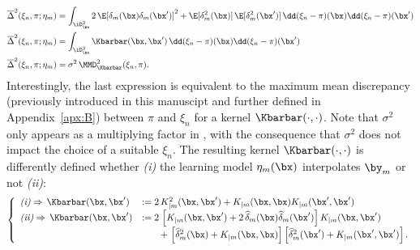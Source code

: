 \begin{subequations}
    \begin{align}
        \overline{\Delta}^2(\xi_n,\pi;\eta_m)&= \int_{\iD_\bx^2} 2 \, \E[\delta_m(\bx)\delta_m(\bx')]^2 + \E[\delta_m^2(\bx)] \, \E[\delta_m^2(\bx')] \,\dd(\xi_n-\pi)(\bx)\dd(\xi_n-\pi)(\bx') \\
        \overline{\Delta}^2(\xi_n,\pi;\eta_m)&= \int_{\iD_\bx^2} \Kbarbar(\bx, \bx')\,\dd(\xi_n-\pi)(\bx)\dd(\xi_n-\pi)(\bx') \label{eq:c5_variance} \\
        \overline{\Delta}^2(\xi_n,\pi;\eta_m)&= \sigma^2\, \MMD_{\Kbarbar}^2(\xi_n,\pi).
    \end{align}
\end{subequations}
Interestingly, the last expression is equivalent to the maximum mean discrepancy (previously introduced in this manuscipt and further defined in Appendix~\ref{apx:B}) between $\pi$ and $\xi_n$ for a kernel $\Kbarbar(\cdot, \cdot)$. 
Note that $\sigma^2$ only appears as a multiplying factor in , with the consequence that $\sigma^2$ does not impact the choice of a suitable $\xi_n$.
The resulting kernel $\Kbarbar(\cdot, \cdot)$ is differently defined whether \textit{(i)} the learning model $\eta_m(\bx)$ interpolates $\by_m$ or not \textit{(ii)}: 
\begin{align}
    \left\{
    \begin{array}{ll}
        \textit{(i)}  \Rightarrow  \, \Kbarbar(\bx,\bx')&:= 2\, K_{|m}^2(\bx,\bx') + K_{|m}(\bx,\bx) K_{|m}(\bx',\bx')\\
        \textit{(ii)} \Rightarrow  \, \Kbarbar(\bx,\bx')&:= 2\, \left[K_{|m}(\bx,\bx') + 2\,\widehat\delta_m(\bx)\widehat\delta_m(\bx')\right]K_{|m}(\bx,\bx') \\
                                                        & \qquad +\,\left[\widehat\delta_m^2(\bx)+K_{|m}(\bx,\bx)\right]\left[\widehat\delta_m^2(\bx')+K_{|m}(\bx',\bx')\right]. 
        \label{Eq:Kbarbar}
    \end{array}
\right.
\end{align}


